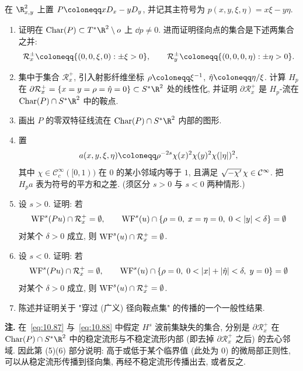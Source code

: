 \begin{exer}[鞍点估计]\label{ex:10.11}
在 $\R_{x,y}^2$ 上置 $P \defeq x D_x - y D_y$, 并记其主符号为 $p(x, y, \xi, \eta) = x\xi - y\eta$.
\begin{enumerate}
    \item 证明在 $\Char(P) \subset T^* \R^2 \setminus o$ 上 $\dd p \neq 0$. 进而证明径向点的集合是下述两集合之并:
    \begin{equation}\label{eq:10.85}
        \mathcal{R}_x^\pm \defeq \{(0, 0, \xi, 0) : \pm\xi > 0\}, \qquad
        \mathcal{R}_y^\pm \defeq \{(0, 0, 0, \eta) : \pm\eta > 0\}.
    \end{equation}
    \item 集中于集合 $\mathcal{R}_x^+$, 引入射影纤维坐标 $\rho \defeq \xi^{-1}$, $\hat{\eta} \defeq \eta/\xi$. 计算 $H_p$ 在 $\partial\mathcal{R}_x^+ = \{x = y = \rho = \hat{\eta} = 0\} \subset S^* \R^2$ 处的线性化, 并证明 $\partial\mathcal{R}_x^+$ 是 $H_p$-流在 $\Char(P) \cap S^* \R^2$ 中的鞍点.
    \item 画出 $P$ 的零双特征线流在 $\Char(P) \cap S^* \R^2$ 内部的图形.
    \item 置
    \begin{equation}\label{eq:10.86}
        a(x, y, \xi, \eta) \defeq \rho^{-2s}\chi(x)^2\chi(y)^2\chi(|\eta|)^2,
    \end{equation}
    其中 $\chi \in \mathcal{C}_c^\infty([0, 1))$ 在 $0$ 的某小邻域内等于 $1$, 且满足 $\sqrt{-\chi'}\,\chi \in \mathcal{C}^\infty$. 把 $H_p a$ 表为符号的平方和之差. (须区分 $s > 0$ 与 $s < 0$ 两种情形.)
    \item 设 $s > 0$. 证明: 若
    \begin{equation}\label{eq:10.87}
        \operatorname{WF}^s(P u) \cap \mathcal{R}_x^+ = \emptyset, \qquad
        \operatorname{WF}^s(u) \cap \{\rho = 0, \; x = \eta = 0, \; 0 < |y| < \delta\} = \emptyset
    \end{equation}
    对某个 $\delta > 0$ 成立, 则 $\operatorname{WF}^s(u) \cap \mathcal{R}_x^+ = \emptyset$.
    \item 设 $s < 0$. 证明: 若
    \begin{equation}\label{eq:10.88}
        \operatorname{WF}^s(P u) \cap \mathcal{R}_x^+ = \emptyset, \qquad
        \operatorname{WF}^s(u) \cap \{\rho = 0, \; 0 < |x| + |\hat{\eta}| < \delta, \; y = 0\} = \emptyset
    \end{equation}
    对某个 $\delta > 0$ 成立, 则 $\operatorname{WF}^s(u) \cap \mathcal{R}_x^+ = \emptyset$.
    \item 陈述并证明关于 "穿过 (广义) 径向鞍点集" 的传播的一个一般性结果.
\end{enumerate}
\textbf{注.} 在~\eqref{eq:10.87} 与~\eqref{eq:10.88} 中假定 $H^s$ 波前集缺失的集合, 分别是 $\partial\mathcal{R}_x^+$ 在 $\Char(P) \cap S^* \R^2$ 中的稳定流形与不稳定流形内部 (即去掉 $\partial\mathcal{R}_x^+$ 之后) 的去心邻域. 因此第 (5)(6) 部分说明: 高于或低于某个临界值 (此处为 $0$) 的微局部正则性, 可以从稳定流形传播到径向集, 再经不稳定流形传播出去, 或者反之.
\end{exer}

